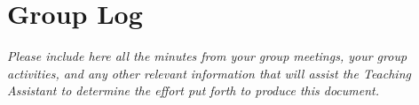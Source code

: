 
\section{Group Log}\label{sec:group-log}
    \emph{Please include here all the minutes from your group meetings, your group activities, and any other relevant information that will assist the Teaching Assistant to determine the effort put forth to produce this document.}
